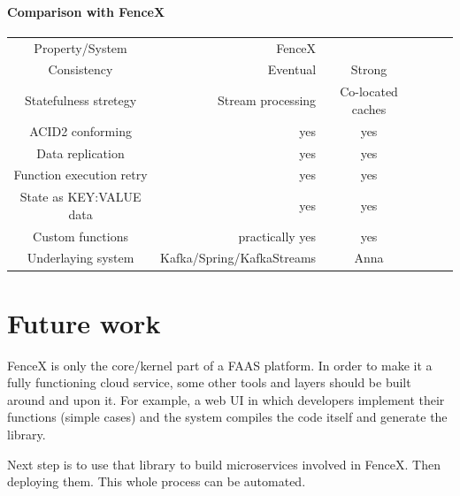 \documentclass[a4]{report}
\begin{document}
    \paragraph{Comparison with FenceX}
    \begin{center}
        \begin{tabular}{ cr cr cr }
            Property/System          & FenceX                    & \cite{Functions-as-a-Service-2020} \\
            Consistency              & Eventual                  & Strong                             \\
            Statefulness stretegy    & Stream processing         & Co-located caches                  \\
            ACID2 conforming         & yes                       & yes                                \\
            Data replication         & yes                       & yes                                \\
            Function execution retry & yes                       & yes                                \\
            State as KEY:VALUE data  & yes                       & yes                                \\
            Custom functions         & practically yes           & yes                                \\
            Underlaying system       & Kafka/Spring/KafkaStreams & Anna                               \\
        \end{tabular}
    \end{center}


    \section{Future work}
    FenceX is only the core/kernel part of a FAAS platform.
    In order to make it a fully functioning cloud service, some other tools and layers should be built around and
    upon it.
    For example, a web UI in which developers implement their functions (simple cases) and the system compiles
    the code itself and generate the library.

    Next step is to use that library to build microservices involved in FenceX.
    Then deploying them.
    This whole process can be automated.

    \nocite{*}
    
    
\end{document}
